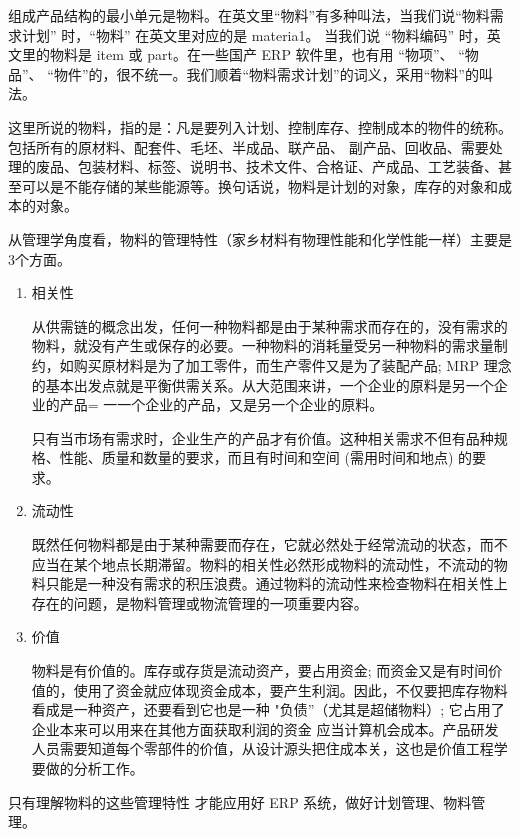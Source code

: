     组成产品结构的最小单元是物料。在英文里“物料”有多种叫法，当我们说“物料需求计划” 时，“物料” 在英文里对应的是 materia1。 当我们说 “物料编码” 时，英文里的物料是 item 或 part。在一些国产 ERP 软件里，也有用 “物项”、 “物品”、 “物件”的，很不统一。我们顺着“物料需求计划”的词义，采用“物料”的叫法。

    这里所说的物料，指的是：凡是要列入计划、控制库存、控制成本的物件的统称。包括所有的原材料、配套件、毛坯、半成品、联产品、 副产品、回收品、需要处理的废品、包装材料、标签、说明书、技术文件、合格证、产成品、工艺装备、甚至可以是不能存储的某些能源等。换句话说，物料是计划的对象，库存的对象和成本的对象。

    从管理学角度看，物料的管理特性（家乡材料有物理性能和化学性能一样）主要是3个方面。

    \begin{enumerate}
        \item 相关性

        从供需链的概念出发，任何一种物料都是由于某种需求而存在的，没有需求的物料，就没有产生或保存的必要。一种物料的消耗量受另一种物料的需求量制约，如购买原材料是为了加工零件，而生产零件又是为了装配产品; MRP 理念的基本出发点就是平衡供需关系。从大范围来讲，一个企业的原料是另一个企业的产品= 一一个企业的产品，又是另一个企业的原料。

        只有当市场有需求时，企业生产的产品才有价值。这种相关需求不但有品种规格、性能、质量和数量的要求，而且有时间和空间 (需用时间和地点) 的要求。

        \item 流动性

        既然任何物料都是由于某种需要而存在，它就必然处于经常流动的状态，而不应当在某个地点长期滞留。物料的相关性必然形成物料的流动性，不流动的物料只能是一种没有需求的积压浪费。通过物料的流动性来检查物料在相关性上存在的问题，是物料管理或物流管理的一项重要内容。

        \item 价值

        物料是有价值的。库存或存货是流动资产，要占用资金; 而资金又是有时间价值的，使用了资金就应体现资金成本，要产生利润。因此，不仅要把库存物料看成是一种资产，还要看到它也是一种 "负债”（尤其是超储物料）; 它占用了企业本来可以用来在其他方面获取利润的资金 应当计算机会成本。产品研发人员需要知道每个零部件的价值，从设计源头把住成本关，这也是价值工程学要做的分析工作。

    \end{enumerate}

    只有理解物料的这些管理特性 才能应用好 ERP 系统，做好计划管理、物料管理。

